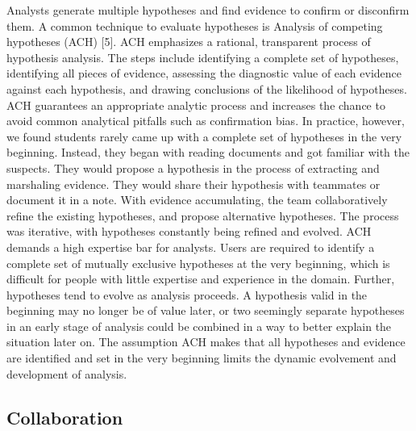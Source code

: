 Analysts generate multiple hypotheses and find evidence to confirm or disconfirm them. A common technique to evaluate hypotheses is Analysis of competing hypotheses (ACH) [5]. ACH emphasizes a rational, transparent process of hypothesis analysis. The steps include identifying a complete set of hypotheses, identifying all pieces of evidence, assessing the diagnostic value of each evidence against each hypothesis, and drawing conclusions of the likelihood of hypotheses. ACH guarantees an appropriate analytic process and increases the chance to avoid common analytical pitfalls such as confirmation bias.
In practice, however, we found students rarely came up with a complete set of hypotheses in the very beginning. Instead, they began with reading documents and got familiar with the suspects. They would propose a hypothesis in the process of extracting and marshaling evidence. They would share their hypothesis with teammates or document it in a note. With evidence accumulating, the team collaboratively refine the existing hypotheses, and propose alternative hypotheses. The process was iterative, with hypotheses constantly being refined and evolved.
ACH demands a high expertise bar for analysts. Users are required to identify a complete set of mutually exclusive hypotheses at the very beginning, which is difficult for people with little expertise and experience in the domain. Further, hypotheses tend to evolve as analysis proceeds. A hypothesis valid in the beginning may no longer be of value later, or two seemingly separate hypotheses in an early stage of analysis could be combined in a way to better explain the situation later on. The assumption ACH makes that all hypotheses and evidence are identified and set in the very beginning limits the dynamic evolvement and development of analysis.

\subsection{Collaboration}

